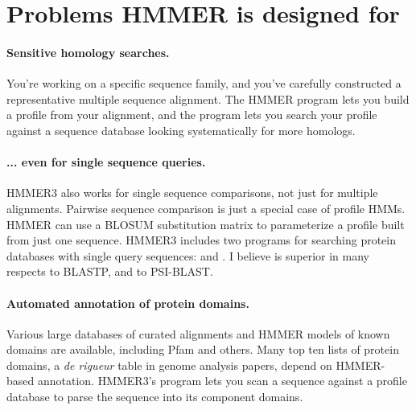 \section{Problems HMMER is designed for}

\paragraph{Sensitive homology searches.}
You're working on a specific sequence family, and you've carefully
constructed a representative multiple sequence alignment. The HMMER
 program lets you build a profile from your alignment,
and the  program lets you search your profile against
a sequence database looking systematically for more homologs.

\paragraph{... even for single sequence queries.}
HMMER3 also works for single sequence comparisons, not just for
multiple alignments. Pairwise sequence comparison is just a special
case of profile HMMs. HMMER can use a BLOSUM substitution matrix to
parameterize a profile built from just one sequence.  HMMER3 includes
two programs for searching protein databases with single query
sequences:  and . I believe
 is superior in many respects to BLASTP, and
 to PSI-BLAST.

\paragraph{Automated annotation of protein domains.}
Various large databases of curated alignments and HMMER models of
known domains are available, including Pfam and others.  Many top ten
lists of protein domains, a \emph{de rigueur} table in genome analysis
papers, depend on HMMER-based annotation. HMMER3's 
program lets you scan a sequence against a profile database to parse
the sequence into its component domains.

